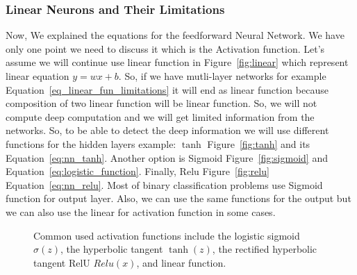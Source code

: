 \subsubsection{Linear Neurons and Their Limitations}

Now, We explained the equations for the feedforward Neural Network. We have only one point we need to discuss it which is the Activation function. Let's assume we will continue use linear function in Figure~\ref{fig:linear} which represent linear equation  $y= w x + b$. So, if we have mutli-layer networks for example Equation~\eqref{eq_linear_fun_limitations} it will end as linear function because composition of two linear function will be linear function. So, we will not compute deep computation and we will get limited information from the networks. So, to be able to detect the deep information we will use different functions for the hidden layers example: $\tanh$ Figure~\ref{fig:tanh} and its Equation~\eqref{eq:nn_tanh}. Another option is Sigmoid Figure~\ref{fig:sigmoid} and  Equation~\eqref{eq:logistic_function}. Finally, Relu Figure~\ref{fig:relu} Equation~\eqref{eq:nn_relu}. Most of binary classification problems use Sigmoid function for output layer. Also, we can use the same functions for the output but we can also use the linear for activation function in some cases.



\begin{figure}[ht!]
  \centering
%
%          
%
          \caption{Common used activation functions include the logistic sigmoid $\sigma(z)$, the hyperbolic tangent $\tanh(z)$, the rectified hyperbolic tangent RelU $Relu(x)$, and linear function.}

\end{figure}

